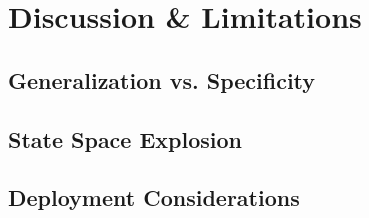 \section{Discussion \& Limitations}

\subsection{Generalization vs. Specificity}

\subsection{State Space Explosion}

\subsection{Deployment Considerations}

